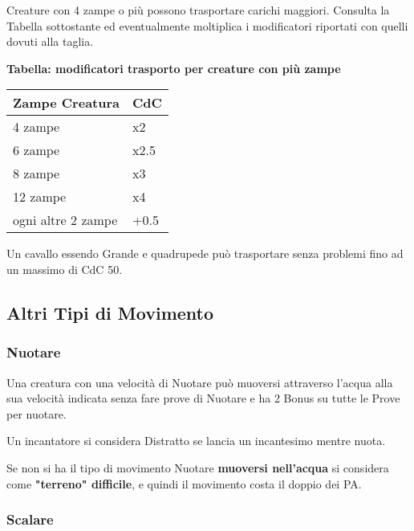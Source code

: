 \documentclass[12pt,a4paper,twoside,openany]{book}
\begin{document}
\begin{multicols}{2}
Creature con 4 zampe o più possono trasportare carichi maggiori. Consulta la Tabella sottostante ed eventualmente moltiplica i modificatori riportati con quelli dovuti alla taglia.


\textbf{Tabella: modificatori trasporto per creature con più zampe}

\medskip

\begin{tabularx}{0.45\textwidth}{ll}
\textbf{Zampe Creatura}&\textbf{CdC}\\
\toprule
4 zampe & x2\\
6 zampe & x2.5\\
8 zampe & x3\\
12 zampe & x4\\
ogni altre 2 zampe & +0.5\\
\end{tabularx}

\medskip

Un cavallo essendo Grande e quadrupede può trasportare senza problemi fino ad un massimo di CdC 50.

\subsection{Altri Tipi di Movimento}

\label{altri-tipi-di-movimento}

\subsubsection{Nuotare}\label{nuotare}

Una creatura con una velocità di Nuotare può muoversi attraverso l'acqua alla sua velocità indicata senza fare prove di Nuotare e ha 2 Bonus su tutte le Prove per nuotare.

Un incantatore si considera Distratto se lancia un incantesimo mentre nuota.

Se non si ha il tipo di movimento Nuotare \textbf{muoversi nell'acqua} si considera come \textbf{"terreno" difficile}, e quindi il movimento costa il doppio dei PA.

\subsubsection{Scalare}\label{scalare}


\end{multicols}
\end{document}
